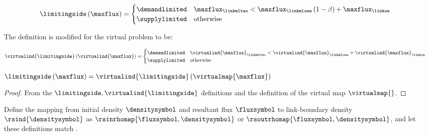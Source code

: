 \[
\limitingside\left(\maxflux\right)=\begin{cases}
\demandlimited & \maxflux_{\linkmltwo}<\maxflux_{\linkmlone}\left(1-\beta\right)+\maxflux_{\linkon}\\
\supplylimited & \text{otherwise}
\end{cases}
\]


The definition is modified for the virtual problem to be:

\[
\virtualind{\limitingside}\left(\virtualind{\maxflux}\right)=\begin{cases}
\demandlimited & \virtualind{\maxflux}_{\linkmltwo}<\virtualind{\maxflux}_{\linkmlone}+\virtualind{\maxflux}_{\linkon}\\
\supplylimited & \text{otherwise}
\end{cases}
\]

\begin{lem}
\label{lem:lsprime-equals-ls-1}$\limitingside\left(\maxflux\right)=\virtualind{\limitingside}\left(\virtualmap{\maxflux}\right)$\end{lem}
\begin{proof}
From the $\limitingside,\virtualind{\limitingside}$ definitions and
the definition of the virtual map $\virtualmap{}$.
\end{proof}
Define the mapping from initial density $\densitysymbol$ and resultant
flux $\fluxsymbol$ to link-boundary density $\rsind{\densitysymbol}$
as $\rsinrhomap{\fluxsymbol,\densitysymbol}$ or $\rsoutrhomap{\fluxsymbol,\densitysymbol}$,
and let these definitions match \cite{garavello2006traffic}.

